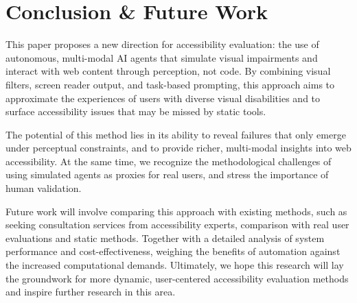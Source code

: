 
\section{Conclusion \& Future Work}

This paper proposes a new direction for accessibility evaluation: the use of autonomous, multi-modal \ac{AI} agents that simulate visual impairments and interact with web content through perception, not code. By combining visual filters, screen reader output, and task-based prompting, this approach aims to approximate the experiences of users with diverse visual disabilities and to surface accessibility issues that may be missed by static tools.

The potential of this method lies in its ability to reveal failures that only emerge under perceptual constraints, and to provide richer, multi-modal insights into web accessibility. At the same time, we recognize the methodological challenges of using simulated agents as proxies for real users, and stress the importance of human validation.

Future work will involve comparing this approach with existing methods, such as seeking consultation services from accessibility experts, comparison with real user evaluations and static methods. Together with a detailed analysis of system performance and cost-effectiveness, weighing the benefits of automation against the increased computational demands. Ultimately, we hope this research will lay the groundwork for more dynamic, user-centered accessibility evaluation methods and inspire further research in this area.



